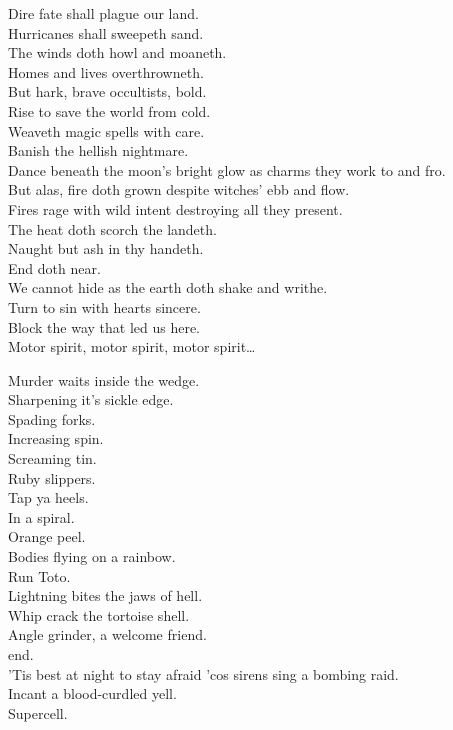 Dire fate shall plague our land. \\
Hurricanes shall sweepeth sand. \\
The winds doth howl and moaneth. \\
Homes and lives overthrowneth. \\
But hark, brave occultists, bold. \\
Rise to save the world from cold. \\
Weaveth magic spells with care. \\
Banish the hellish nightmare. \\

Dance beneath the moon's bright glow as charms they work to and fro. \\
But alas, fire doth grown despite witches' ebb and flow. \\
Fires rage with wild intent destroying all they present. \\
The heat doth scorch the landeth. \\
Naught but ash in thy handeth. \\

End doth near. \\
We cannot hide as the earth doth shake and writhe. \\
Turn to sin with hearts sincere. \\
Block the way that led us here. \\

Motor spirit, motor spirit, motor spirit… \\



Murder waits inside the wedge. \\
Sharpening it's sickle edge. \\
Spading forks. \\
Increasing spin. \\
Screaming tin. \\
Ruby slippers. \\
Tap ya heels. \\
In a spiral. \\
Orange peel. \\
Bodies flying on a rainbow. \\
Run Toto. \\
Lightning bites the jaws of hell. \\
Whip crack the tortoise shell. \\
Angle grinder, a welcome friend. \\
 end. \\
'Tis best at night to stay afraid 'cos sirens sing a bombing raid. \\
Incant a blood-curdled yell. \\
Supercell. \\

